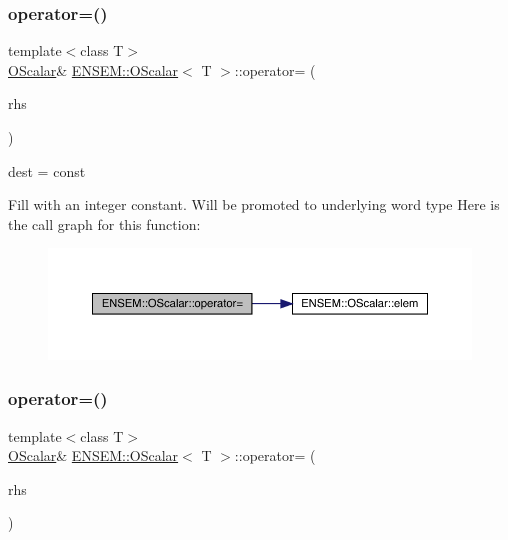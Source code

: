 \subsubsection{\texorpdfstring{operator=()}{operator=()}\hspace{0.1cm}{\footnotesize\ttfamily [2/8]}}
{\footnotesize\ttfamily template$<$class T$>$ \\
\mbox{\hyperlink{classENSEM_1_1OScalar}{O\+Scalar}}\& \mbox{\hyperlink{classENSEM_1_1OScalar}{E\+N\+S\+E\+M\+::\+O\+Scalar}}$<$ T $>$\+::operator= (\begin{DoxyParamCaption}\item[{const typename \mbox{\hyperlink{structENSEM_1_1WordType}{Word\+Type}}$<$ T $>$\+::Type\+\_\+t \&}]{rhs }\end{DoxyParamCaption})\hspace{0.3cm}{\ttfamily [inline]}}



dest = const 

Fill with an integer constant. Will be promoted to underlying word type Here is the call graph for this function\+:
\nopagebreak
\begin{figure}[H]
\begin{center}
\leavevmode
\includegraphics[width=350pt]{da/d80/classENSEM_1_1OScalar_a88bbb49d2879dba60c29d7792a8af8dc_cgraph}
\end{center}
\end{figure}
\mbox{\label{classENSEM_1_1OScalar_a4fdfed29e219b358e05588826e672932}} 
\subsubsection{\texorpdfstring{operator=()}{operator=()}\hspace{0.1cm}{\footnotesize\ttfamily [3/8]}}
{\footnotesize\ttfamily template$<$class T$>$ \\
\mbox{\hyperlink{classENSEM_1_1OScalar}{O\+Scalar}}\& \mbox{\hyperlink{classENSEM_1_1OScalar}{E\+N\+S\+E\+M\+::\+O\+Scalar}}$<$ T $>$\+::operator= (\begin{DoxyParamCaption}\item[{const \mbox{\hyperlink{structENSEM_1_1Zero}{Zero}} \&}]{rhs }\end{DoxyParamCaption})\hspace{0.3cm}{\ttfamily [inline]}}



